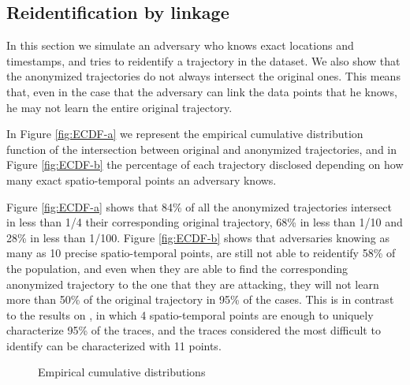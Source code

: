 \documentclass{llncs}
\begin{document}
\subsection{Reidentification by linkage}

In this section we simulate an adversary who knows exact locations and timestamps, and tries to reidentify a trajectory in the dataset.
We also show that the anonymized trajectories do not always intersect the original ones. This means that, even in the case that the adversary can link the data points that he knows, he may not learn the entire original trajectory. 

In Figure \ref{fig:ECDF-a} we represent the empirical cumulative distribution function of the intersection between original and anonymized trajectories, and in Figure \ref{fig:ECDF-b} the percentage of each trajectory disclosed depending on how many exact spatio-temporal points an adversary knows.

Figure \ref{fig:ECDF-a} shows that 
84\% of all the anonymized trajectories intersect in less than 1/4 their corresponding original trajectory, 68\% in less than 1/10 and 28\% in less than 1/100.
Figure \ref{fig:ECDF-b} shows that adversaries knowing as many as 10 precise spatio-temporal points, are still not able to reidentify 58\% of the population, and even when they are able to find the corresponding anonymized trajectory to the one that they are attacking, they will not learn more than 50\% of the original trajectory in 95\% of the cases.
This is in contrast to the results on \cite{demontjoye2013}, in which 4 spatio-temporal points are enough to uniquely characterize 95\% of the traces, and the traces considered the most difficult to identify can be characterized with 11 points.

\begin{figure}
\hfil 
{}
  \caption{Empirical cumulative distributions}
  \label{fig:ECDF}
\end{figure}
\end{document}
